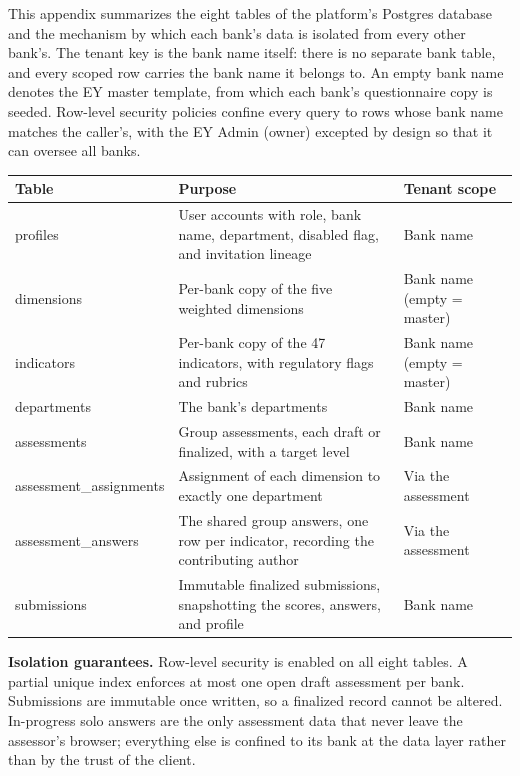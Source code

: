 This appendix summarizes the eight tables of the platform's Postgres database and the mechanism by which each bank's data is isolated from every other bank's. The tenant key is the bank name itself: there is no separate bank table, and every scoped row carries the bank name it belongs to. An empty bank name denotes the EY master template, from which each bank's questionnaire copy is seeded. Row-level security policies confine every query to rows whose bank name matches the caller's, with the EY Admin (owner) excepted by design so that it can oversee all banks.

\vspace{0.6em}
{\small
\setlength{\tabcolsep}{4pt}
\begin{center}
\begin{tabular}{|p{3.2cm}|p{8.0cm}|p{2.8cm}|}
\hline
\textbf{Table} & \textbf{Purpose} & \textbf{Tenant scope} \\
\hline
profiles & User accounts with role, bank name, department, disabled flag, and invitation lineage & Bank name \\
\hline
dimensions & Per-bank copy of the five weighted dimensions & Bank name (empty = master) \\
\hline
indicators & Per-bank copy of the 47 indicators, with regulatory flags and rubrics & Bank name (empty = master) \\
\hline
departments & The bank's departments & Bank name \\
\hline
assessments & Group assessments, each draft or finalized, with a target level & Bank name \\
\hline
assessment\_assignments & Assignment of each dimension to exactly one department & Via the assessment \\
\hline
assessment\_answers & The shared group answers, one row per indicator, recording the contributing author & Via the assessment \\
\hline
submissions & Immutable finalized submissions, snapshotting the scores, answers, and profile & Bank name \\
\hline
\end{tabular}
\end{center}
}
\label{tab:data-model}

\vspace{0.8em}
\noindent \textbf{Isolation guarantees.} Row-level security is enabled on all eight tables. A partial unique index enforces at most one open draft assessment per bank. Submissions are immutable once written, so a finalized record cannot be altered. In-progress solo answers are the only assessment data that never leave the assessor's browser; everything else is confined to its bank at the data layer rather than by the trust of the client.

